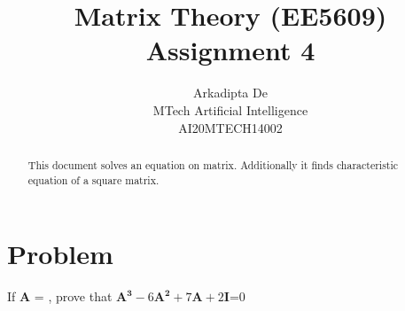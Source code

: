 \documentclass[journal,12pt,twocolumn]{IEEEtran}
\begin{document}
\makeatletter
{}
\makeatother
\let\StandardTheFigure\thefigure
\let\vec\mathbf
\renewcommand{\thefigure}{\theproblem}
\def\putbox#1#2#3{\makebox[0in][l]{\makebox[#1][l]{}\raisebox{\baselineskip}[0in][0in]{\raisebox{#2}[0in][0in]{#3}}}}
     \def\rightbox#1{\makebox[0in][r]{#1}}
     \def\centbox#1{\makebox[0in]{#1}}
     \def\topbox#1{\raisebox{-\baselineskip}[0in][0in]{#1}}
     \def\midbox#1{\raisebox{-0.5\baselineskip}[0in][0in]{#1}}
\vspace{3cm}
\title{Matrix Theory (EE5609) Assignment 4}
\author{Arkadipta De\\MTech Artificial Intelligence\\AI20MTECH14002}

\maketitle
\newpage
\bigskip
\renewcommand{\thefigure}{\theenumi}
\renewcommand{\thetable}{\theenumi}

\begin{abstract}
This document solves an equation on matrix. Additionally it finds characteristic equation of a square matrix.
\end{abstract}
\begin{comment}
The code for the solution of this problem can be found at
%
\begin{lstlisting}
https://github.com/Arko98/EE5609/blob/master/Assignment_4/Codes/Solution.py
\end{lstlisting}
%
\end{comment}
\section{Problem}
If $\vec{A}$ = , prove that $\vec{A^3}-6\vec{A^2}+7\vec{A}+2\vec{I}$=0
\end{document}

